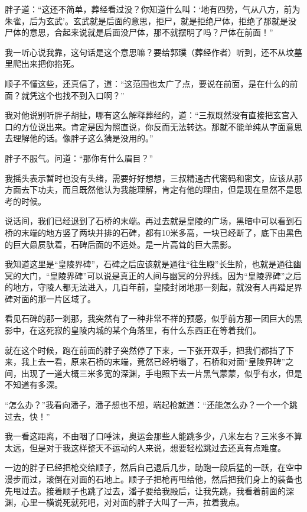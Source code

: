 胖子道：“这还不简单，葬经看过没？你知道什么叫：‘地有四势，气从八方，前为朱雀，后为玄武’。玄武就是后面的意思，拒尸，就是拒绝尸体，拒绝了那就是没尸体的意思，合起来说就是后面没尸体，那不就摆明了吗？尸体在前面！”

我一听心说我靠，这句话是这个意思嘛？要给郭璞（葬经作者）听到，还不从坟墓里爬出来把你掐死。

顺子不懂这些，还真信了，道：“这范围也太广了点，要说在前面，是在什么的前面？就凭这个也找不到入口啊？”

我对他说别听胖子胡扯，哪有这么解释葬经的，道：“三叔既然没有直接把玄宫入口的方位说出来。肯定是因为照直说，你反而无法转达。那就不能单纯从字面意思去理解他的话。像胖子这么猜是没用的。”

胖子不服气。问道：“那你有什么眉目？”

我摇头表示暂时也没有头绪，需要好好想想，三叔精通古代密码和密文，应该从那方面去下功夫，而且既然他认为我能理解，肯定有他的理由，但是现在显然不是思考的时候。

说话间，我们已经退到了石桥的末端。再过去就是皇陵的广场，黑暗中可以看到石桥的末端的地方竖了两块并排的石碑，都有10米多高，一块已经断了，底下由黑色的巨大赑屃驮着，石碑后面的不远处。是一片高耸的巨大黑影。

我知道这里是“皇陵界碑”，石碑之后应该就是通往“往生殿”长生阶，也就是通往幽冥的大门，“皇陵界碑”可以说是真正的人间与幽冥的分界线。因为“皇陵界碑”之后的地方，守陵人都无法进入，几百年前，皇陵封闭地那一刻起，就没有人再踏足界碑对面的那一片区域了。

看见石碑的那一刹那，我突然有了一种非常不祥的预感，似乎前方那一团巨大的黑影中，在这死寂的皇陵内城的某个角落里，有什么东西正在等着我们。

就在这个时候，跑在前面的胖子突然停了下来，一下张开双手，把我们都挡了下来，我上去一看，原来石桥的末端，竟然已经坍塌了，石桥和对面“皇陵界碑”之间，出现了一道大概三米多宽的深渊，手电照下去一片黑气蒙蒙，似乎有水，但是不知道有多深。

“怎么办？”我看向潘子，潘子想也不想，端起枪就道：“还能怎么办？一个一个跳过去，快！”

我一看这距离，不由咽了口唾沫，奥运会那些人能跳多少，八米左右？三米多不算太远，但是对于我这样整天不运动的人来说，想要轻松跳过去还真有点难度。

一边的胖子已经把枪交给顺子，然后自己退后几步，助跑一段后猛的一跃，在空中漫步而过，滚倒在对面的石地上。顺子子把枪再甩给他，然后把我们身上的装备也先甩过去。接着顺子也跳了过去，潘子要给我殿后，让我先跳，我看着前面的深渊，心里一横说死就死吧，对对面的胖子大叫了一声，拉着我点。

